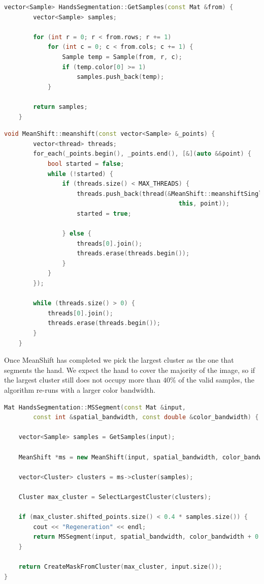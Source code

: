 \begin{lstlisting}[language = c++]
    vector<Sample> HandsSegmentation::GetSamples(const Mat &from) {
        vector<Sample> samples;
    
        for (int r = 0; r < from.rows; r += 1)
            for (int c = 0; c < from.cols; c += 1) {
                Sample temp = Sample(from, r, c);
                if (temp.color[0] >= 1)
                    samples.push_back(temp);
            }
    
        return samples;
    }
\end{lstlisting}

\begin{lstlisting}[language = c++]    
    void MeanShift::meanshift(const vector<Sample> &_points) {
        vector<thread> threads;
        for_each(_points.begin(), _points.end(), [&](auto &&point) {
            bool started = false;
            while (!started) {
                if (threads.size() < MAX_THREADS) {
                    threads.push_back(thread(&MeanShift::meanshiftSinglePoint, 
                                                this, point));
                    started = true;
    
                } else {
                    threads[0].join();
                    threads.erase(threads.begin());
                }
            }
        });
    
        while (threads.size() > 0) {
            threads[0].join();
            threads.erase(threads.begin());
        }
    }
\end{lstlisting}

Once MeanShift has completed we pick the largest cluster as the one
that segments the hand. We expect the hand to cover the majority of the image,
so if the largest cluster still does not occupy more than $40\%$ of the valid
samples, the algorithm re-runs with a larger color bandwidth.

\begin{lstlisting}[language = c++]
Mat HandsSegmentation::MSSegment(const Mat &input, 
        const int &spatial_bandwidth, const double &color_bandwidth) {

    vector<Sample> samples = GetSamples(input);

    MeanShift *ms = new MeanShift(input, spatial_bandwidth, color_bandwidth);

    vector<Cluster> clusters = ms->cluster(samples);

    Cluster max_cluster = SelectLargestCluster(clusters);

    if (max_cluster.shifted_points.size() < 0.4 * samples.size()) {
        cout << "Regeneration" << endl;
        return MSSegment(input, spatial_bandwidth, color_bandwidth + 0.5);
    }

    return CreateMaskFromCluster(max_cluster, input.size());
}
\end{lstlisting}
\newpage
